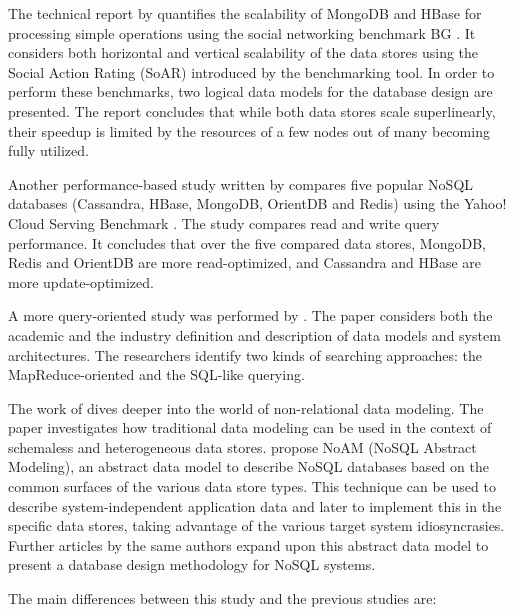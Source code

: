 The technical report by \textcite{Barahmand2015} quantifies the scalability of MongoDB and HBase for processing simple operations using the social networking benchmark BG \autocite{Barahmand2013}.
It considers both horizontal and vertical scalability of the data stores using the Social Action Rating (SoAR) introduced by the benchmarking tool.
In order to perform these benchmarks, two logical data models for the database design are presented.
The report concludes that while both data stores scale superlinearly, their speedup is limited by the resources of a few nodes out of many becoming fully utilized.

Another performance-based study written by \textcite{Abramova2014} compares five popular NoSQL databases (Cassandra, HBase, MongoDB, OrientDB and Redis) using the Yahoo! Cloud Serving Benchmark \autocite{Cooper2010}.
The study compares read and write query performance.
It concludes that over the five compared data stores, MongoDB, Redis and OrientDB are more read-optimized, and Cassandra and HBase are more update-optimized.

A more query-oriented study was performed by \textcite{Zhou2013}.
The paper considers both the academic and the industry definition and description of data models and system architectures.
The researchers identify two kinds of searching approaches: the MapReduce-oriented and the SQL-like querying.

The work of \textcite{Atzeni2016} dives deeper into the world of non-relational data modeling.
The paper investigates how traditional data modeling can be used in the context of schemaless and heterogeneous data stores.
\citeauthor{Atzeni2016} propose NoAM (NoSQL Abstract Modeling), an abstract data model to describe NoSQL databases based on the common surfaces of the various data store types.
This technique can be used to describe system-independent application data and later to implement this in the specific data stores, taking advantage of the various target system idiosyncrasies.
Further articles by the same authors \autocite{Bugiotti2014} expand upon this abstract data model to present a database design methodology for NoSQL systems.


The main differences between this study and the previous studies are:

